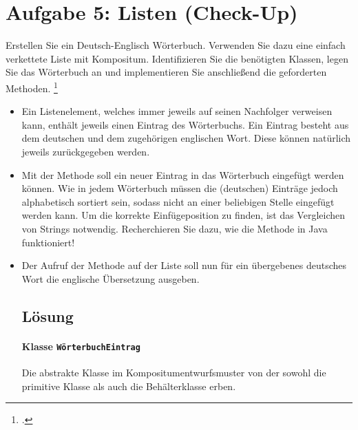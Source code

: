 \documentclass{lehramt-informatik-haupt}
\begin{document}
%

\section{Aufgabe 5: Listen (Check-Up)}

Erstellen Sie ein Deutsch-Englisch Wörterbuch. Verwenden Sie dazu eine
einfach verkettete Liste mit Kompositum. Identifizieren Sie die
benötigten Klassen, legen Sie das Wörterbuch an und implementieren Sie
anschließend die geforderten Methoden.
\footcite[Seite 4, Aufgabe 5]{aud:ab:5}

\begin{itemize}
\item Ein Listenelement, welches immer jeweils auf seinen Nachfolger
verweisen kann, enthält jeweils einen Eintrag des Wörterbuchs. Ein
Eintrag besteht aus dem deutschen und dem zugehörigen englischen Wort.
Diese können natürlich jeweils zurückgegeben werden.

\item Mit der Methode 
soll ein neuer Eintrag in das Wörterbuch eingefügt werden können. Wie in
jedem Wörterbuch müssen die (deutschen) Einträge jedoch alphabetisch
sortiert sein, sodass nicht an einer beliebigen Stelle eingefügt werden
kann. Um die korrekte Einfügeposition zu finden, ist das Vergleichen von
Strings notwendig. Recherchieren Sie dazu, wie die Methode
 in Java funktioniert!

\item Der Aufruf der Methode  auf der
Liste soll nun für ein übergebenes deutsches Wort die englische
Übersetzung ausgeben.

%

\subsection{Lösung}

\paragraph{Klasse \texttt{WörterbuchEintrag}}

Die abstrakte Klasse im Kompositumentwurfsmuster von der sowohl die
primitive Klasse als auch die Behälterklasse erben.


\end{itemize}
\end{document}
